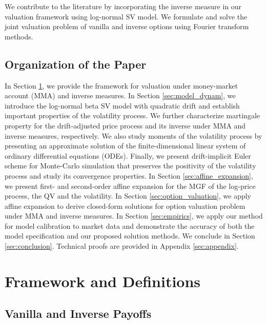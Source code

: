 \documentclass[11pt,a4paper] {article}
\begin{document}
We contribute to the literature by incorporating the inverse measure in our valuation framework using log-normal SV model. We formulate and solve the joint valuation problem of vanilla and inverse options using Fourier transform methods.


\subsection{Organization of the Paper}

In Section \ref{sec:setup}, we provide the framework for valuation under money-market account (MMA) and inverse measures. 
In Section \ref{sec:model_dynam}, we introduce the log-normal beta SV model with quadratic drift and  establish important properties of the volatility process. We further characterize martingale property for the drift-adjusted price process and its inverse under MMA and inverse measures, respectively. We also study moments of the volatility process by presenting an approximate solution of the finite-dimensional linear system of ordinary differential equations (ODEs). Finally, we present drift-implicit Euler scheme for Monte-Carlo simulation that preserves the positivity of the volatility process and study its convergence properties. In Section \ref{sec:affine_expansion}, we present first- and second-order affine expansion for the MGF of the log-price process, the QV and the volatility. 
In Section \ref{sec:option_valuation}, we apply affine expansion to derive closed-form solutions for option valuation problem under MMA and inverse measures.
In Section \ref{sec:empirics}, we apply our method for model calibration to market data and demonstrate the accuracy of both the model specification and our proposed solution methods. We conclude in Section \ref{sec:conclusion}. Technical proofs are provided in Appendix \ref{sec:appendix}. 



\section{Framework and Definitions}\label{sec:setup}


\subsection{Vanilla and Inverse Payoffs} \label{sec:der}
\end{document}
